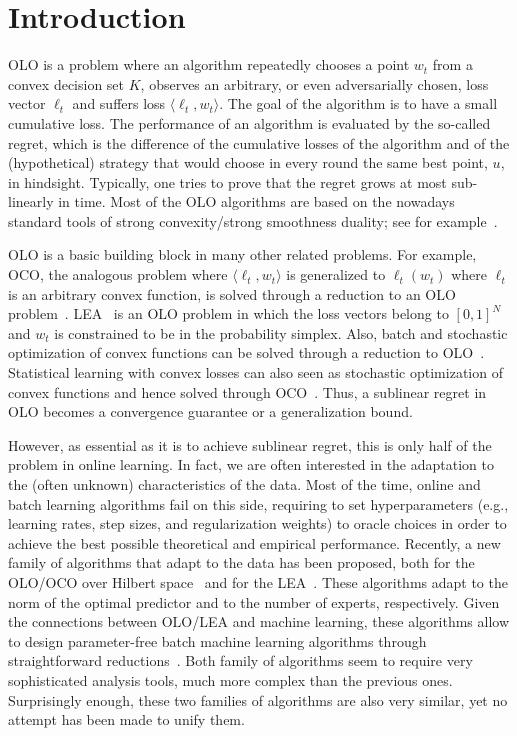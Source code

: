 \section{Introduction}
\label{section:introduction}

\ac{OLO} is a problem where an algorithm repeatedly chooses a point $w_t$ from
a convex decision set $K$, observes an arbitrary, or even adversarially chosen,
loss vector $\ell_t$ and suffers loss $\langle \ell_t, w_t \rangle$. The goal
of the algorithm is to have a small cumulative loss. The performance of an
algorithm is evaluated by the so-called regret, which is the difference of the
cumulative losses of the algorithm and of the (hypothetical) strategy that
would choose in every round the same best point, $u$, in hindsight. Typically,
one tries to prove that the regret grows at most sub-linearly in time. Most of
the \ac{OLO} algorithms are based on the nowadays standard tools of strong
convexity/strong smoothness duality; see for example~\citet{Shalev-Shwartz12}.

\ac{OLO} is a basic building block in many other related problems. For example,
\ac{OCO}, the analogous problem where $\langle \ell_t, w_t \rangle$ is
generalized to $\ell_t(w_t)$ where $\ell_t$ is an arbitrary convex function, is
solved through a reduction to an \ac{OLO}
problem~\citep{Cesa-BianchiL06,Shalev-Shwartz12}.
\ac{LEA}~\citep{LittlestoneW94,Vovk98,Cesa-BianchiFHHSW97} is an \ac{OLO}
problem in which the loss vectors belong to $[0,1]^N$ and $w_t$ is constrained
to be in the probability simplex. Also, batch and stochastic optimization of
convex functions can be solved through a reduction to
\ac{OLO}~\citep{Shalev-Shwartz12}. Statistical learning with convex losses can
also seen as stochastic optimization of convex functions and hence solved
through \ac{OCO}~\citep{Munro1951}. Thus, a sublinear regret in \ac{OLO} becomes
a convergence guarantee or a generalization bound.

However, as essential as it is to achieve sublinear regret, this is only half of
the problem in online learning. In fact, we are often interested in the
adaptation to the (often unknown) characteristics of the data. Most of the time,
online and batch learning algorithms fail on this side, requiring to set
hyperparameters (e.g., learning rates, step sizes, and regularization weights)
to oracle choices in order to achieve the best possible theoretical and
empirical performance. Recently, a new family of algorithms that adapt to the
data has been proposed, both for the \ac{OLO}/\ac{OCO} over Hilbert
space~\citep{StreeterM12,Orabona13,McMahanA13,McMahanO14,Orabona14} and for the
\ac{LEA}~\citep{ChaudhuriYH09,ChernovV10,LuoE14,LuoS15,KoolenE15}. These
algorithms adapt to the norm of the optimal predictor and to the number of
experts, respectively. Given the connections between \ac{OLO}/\ac{LEA} and
machine learning, these algorithms allow to design parameter-free batch machine
learning algorithms through straightforward reductions~\citep{Orabona14,LuoS15}.
Both family of algorithms seem to require very sophisticated analysis tools,
much more complex than the previous ones. Surprisingly enough, these two
families of algorithms are also very similar, yet no attempt has been made to
unify them.

